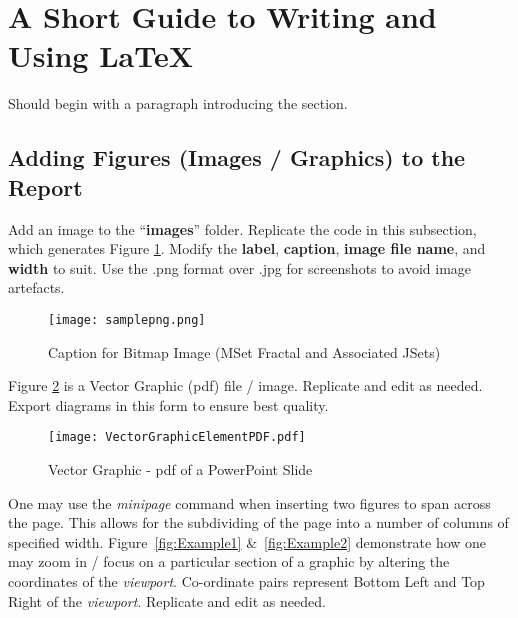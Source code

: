\clearpage %

\section{A Short Guide to Writing and Using \LaTeX} \label{sec:UsingLaTeXGuide}
Should begin with a paragraph introducing the section. 

\subsection{Adding Figures (Images / Graphics) to the Report}

Add an image to the ``\textbf{images}'' folder. Replicate the code in this subsection, which generates Figure \ref{fig:samplepngImage}. Modify the \textbf{label}, \textbf{caption}, \textbf{image file name}, and \textbf{width} to suit. Use the .png format over .jpg for screenshots to avoid image artefacts. 

\begin{figure}[H]
\begin{center}
\texttt{[image: samplepng.png]}
\caption{Caption for Bitmap Image (MSet Fractal and Associated JSets)} \label{fig:samplepngImage}
\end{center}
\end{figure}

Figure \ref{fig:VectorGraphicElementPDF} is a Vector Graphic (pdf) file / image. Replicate and edit as needed. Export diagrams in this form to ensure best quality. 

\begin{figure}[H]
\centering
\texttt{[image: VectorGraphicElementPDF.pdf]}
\caption{Vector Graphic - pdf of a PowerPoint Slide}
\label{fig:VectorGraphicElementPDF}
\end{figure}

One may use the \emph{minipage} command when inserting two figures to span across the page. This allows for the subdividing of the page into a number of columns of specified width. Figure~\ref{fig:Example1} \&~\ref{fig:Example2} demonstrate how one may zoom in / focus on a particular section of a graphic by altering the coordinates of the \emph{viewport}. Co-ordinate pairs represent Bottom Left and Top Right of the \emph{viewport}. Replicate and edit as needed. 

